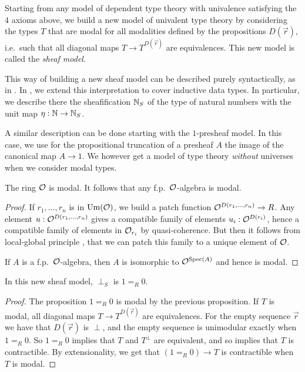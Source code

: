   Starting from any model of dependent type theory with univalence satisfying the 4 axioms above, we build a new
  model of univalent type theory by considering the types $T$ that are modal for all modalities defined by the propositions
  $D(\vec{r})$, i.e.\ such that all diagonal maps $T\rightarrow T^{D(\vec{r})}$ are equivalences.
  This new model is called the \emph{sheaf model}.

    This way of building a new sheaf model can be described purely syntactically, as in \cite{Quirin16}. In \cite{CRS21}, we extend
    this interpretation to cover inductive data types. In particular, we describe there the sheafification $\mathbb{N}_S$ of the type
    of natural numbers with the unit map $\eta:\mathbb{N}\rightarrow\mathbb{N}_S$. 

    A similar description can be done starting with the $1$-presheaf model. In this case, we use for the propositional truncation of a
    presheaf $A$ the image of the canonical map $A\rightarrow 1$. We however get a model of type theory {\em without} universes when we
    consider modal types.

    \begin{proposition}\label{modal}
      The ring $\mathcal O$ is modal. It follows that any f.p.\ $\mathcal O$-algebra is modal.
    \end{proposition}

    \begin{proof}
      If $r_1,\dots,r_n$ is in $\mathrm{Um}(\mathcal O)$, we build a patch function $\mathcal O^{D(r_1,\dots,r_n)}\rightarrow R$.
      Any element $u:\mathcal O^{D(r_1,\dots,r_n)}$ gives a compatible family of elements $u_i:\mathcal O^{D(r_i)}$, hence
      a compatible family of elements in $\mathcal O_{r_i}$ by quasi-coherence. But then it follows from local-global
      principle \cite{lombardi-quitte}, that we can patch this family to a unique element of $\mathcal O$.
      
      If $A$ is a f.p.\ $\mathcal O$-algebra, then $A$ is isomorphic to $\mathcal O^{\operatorname{Spec}(A)}$ and hence is modal.
    \end{proof}

    \begin{proposition}
      In this new sheaf model, $\perp_S$ is $1 =_R 0$.
    \end{proposition}

    \begin{proof}
      The proposition $1=_R0$ is modal by the previous proposition.
      If $T$ is modal, all diagonal maps $T\rightarrow T^{D(\vec{r})}$ are equivalences. For the empty sequence $\vec{r}$
      we have that $D(\vec{r})$ is $\perp$, and the empty sequence is unimodular exactly when $1 =_R 0$. So $1=_R0$
      implies that $T$ and $T^{\perp}$ are equivalent, and so implies that $T$ is contractible. By extensionality,
      we get that $(1=_R0)\rightarrow T$ is contractible when $T$ is modal.
    \end{proof}
    

